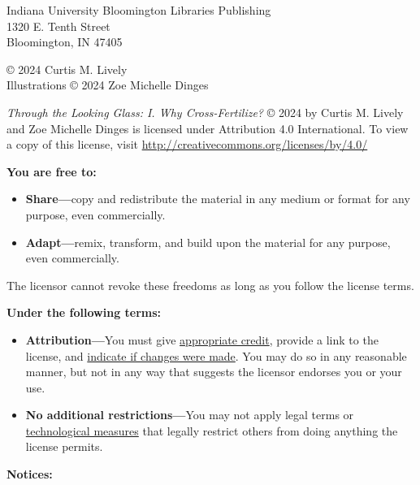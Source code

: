 \null\vfill
\begin{flushleft}
\thispagestyle{empty}
Indiana University Bloomington Libraries Publishing\\
1320 E. Tenth Street\\
Bloomington, IN 47405
\vspace{5mm}

© 2024 Curtis M. Lively\\
Illustrations © 2024 Zoe Michelle Dinges

\vspace{3mm}
\ccby

\textit{Through the Looking Glass: I. Why Cross-Fertilize?} © 2024 by Curtis M. Lively and Zoe Michelle Dinges is licensed under Attribution 4.0 International. To view a copy of this license, visit \url{http://creativecommons.org/licenses/by/4.0/}

\textbf{You are free to:}
\begin{itemize}
\tightlist
\item
  \textbf{Share---}copy and redistribute the material in any medium or format for any purpose, even commercially.\\
\item
  \textbf{Adapt---}remix, transform, and build upon the material for any purpose, even commercially.
\end{itemize}

The licensor cannot revoke these freedoms as long as you follow the license terms.

\textbf{Under the following terms:}
\begin{itemize}
\tightlist
\item
  \textbf{Attribution---}You must give
  \href{https://creativecommons.org/licenses/by/4.0/\#ref-appropriate-credit}{appropriate credit}, provide a link to the license, and
  \href{https://creativecommons.org/licenses/by/4.0/\#ref-indicate-changes}{indicate if changes were made}. You may do so in any reasonable manner, but not in any way that suggests the licensor endorses you or your use.\\
\item
  \textbf{No additional restrictions---}You may not apply legal terms or
  \href{https://creativecommons.org/licenses/by/4.0/\#ref-technological-measures}{technological measures} that legally restrict others from doing anything the license permits.
\end{itemize}

\textbf{Notices:}


\end{flushleft}
